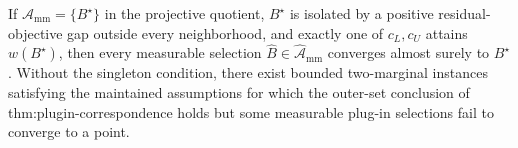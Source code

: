 If \(\mathcal A_{\mathrm{mm}}=\{B^\star\}\) in the projective quotient, \(B^\star\) is isolated by a positive residual-objective gap outside every neighborhood, and exactly one of \(c_L,c_U\) attains \(w(B^\star)\), then every measurable selection \(\widehat B\in\widehat{\mathcal A}_{\mathrm{mm}}\) converges almost surely to \(B^\star\). Without the singleton condition, there exist bounded two-marginal instances satisfying the maintained assumptions for which the outer-set conclusion of thm:plugin-correspondence holds but some measurable plug-in selections fail to converge to a point.